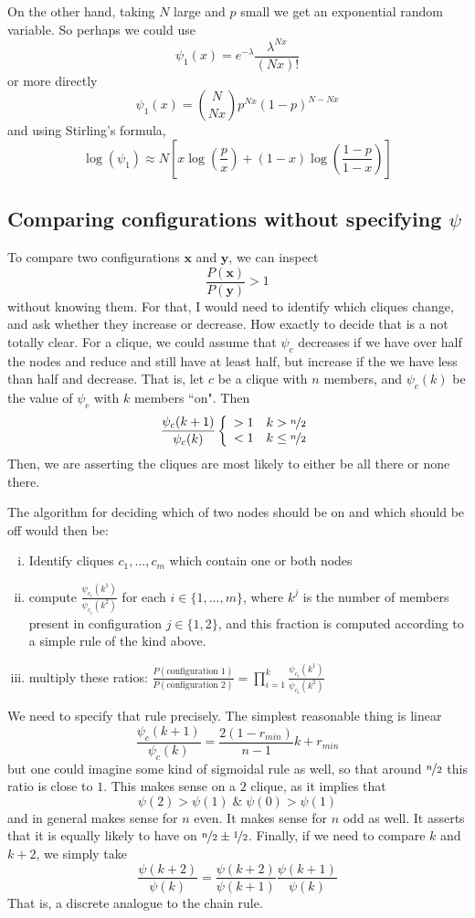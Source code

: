 \documentclass[10pt]{article}
\theoremstyle{definition}
\numberwithin{theorem}{section}
\numberwithin{definition}{section}
\numberwithin{lemma}{section}
\numberwithin{corollary}{section}
\numberwithin{clm}{section}
\numberwithin{rmk}{section}
\renewcommand{\b}{\bm}
\begin{document}
On the other hand, taking $N$ large and $p$ small we get an exponential random variable. So perhaps we could use
\[
\psi_1(x) = e^{-\lambda}\frac{\lambda^{Nx}}{(Nx)!}
\]
or more directly
\[
\psi_1(x) = \binom{N}{Nx}p^{Nx}(1-p)^{N-Nx}
\]
and using Stirling's formula,
\[
\log(\psi_1) \approx N\left[x \log\left(\frac{p}{x}\right) + (1-x)\log\left(\frac{1-p}{1-x}\right)\right]
\]

\subsection{Comparing configurations without specifying $\psi$}
To compare two configurations $\b{x}$ and $\b{y}$, we can inspect
\[
\frac{P(\b{x})}{P(\b{y})} > 1
\]
without knowing them. For that, I would need to identify which cliques change, and ask whether they increase or decrease. How exactly to decide that is a not totally clear. For a clique, we could assume that $\psi_c$ decreases if we have over half the nodes and reduce and still have at least half, but increase if the we have less than half and decrease. That is, let $c$ be a clique with $n$ members, and $\psi_c(k)$ be the value of $\psi_c$ with $k$ members ``on". Then
\[
\frac{\psi_c(k+1)}{\psi_c(k)}   \left\{\begin{array}{c c}
>1 & k>\nicefrac{n}{2}\\
<1 & k\leq \nicefrac{n}{2}
\end{array}\right.
\]
Then, we are asserting the cliques are most likely to either be all there or none there.

The algorithm for deciding which of two nodes should be on and which should be off would then be:
\begin{enumerate}[(i)]
	\item Identify cliques $c_1,...,c_m$ which contain one or both nodes
	\item compute $\frac{\psi_{c_i}(k^1)}{\psi_{c_i}(k^2)}$ for each  $i \in \{1,...,m\}$, where $k^j$ is the number of members present in configuration $j \in \{1,2\}$, and this fraction is computed according to a simple rule of the kind above.
	\item multiply these ratios: $\frac{P(\text{configuration 1})}{P(\text{configuration 2})} = \prod_{i=1}^k \frac{\psi_{c_i}(k^1)}{\psi_{c_i}(k^2)}$
\end{enumerate}

We need to specify that rule precisely. The simplest reasonable thing is linear
\[
\frac{\psi_c(k+1)}{\psi_c(k)} = \frac{2(1-r_{min})}{n - 1} k + r_{min}
\]
but one could imagine some kind of sigmoidal rule as well, so that around $\nicefrac{n}{2}$ this ratio is close to $1$. This makes sense on a $2$ clique, as it implies that
\[
\psi(2) > \psi(1) \; \& \; \psi(0) > \psi(1)
\]
and in general makes sense for $n$ even. It makes sense for $n$ odd as well. It asserts that it is equally likely to have on $\nicefrac{n}{2} \pm \nicefrac{1}{2}$. Finally, if we need to compare $k$ and $k+2$, we simply take
\[
\frac{\psi(k+2)}{\psi(k)} = \frac{\psi(k+2)}{\psi(k+1)}\frac{\psi(k+1)}{\psi(k)}
\]
That is, a discrete analogue to the chain rule.
\end{document}

